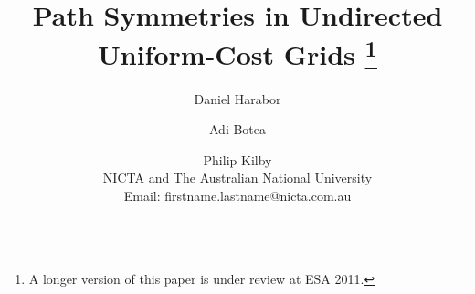 \documentclass{article}
\begin{document}
\title{Path Symmetries in Undirected Uniform-Cost Grids
\thanks{A longer version of this paper is under review at ESA 2011. }
}
\author{Daniel Harabor \and Adi Botea \and Philip Kilby \\
NICTA and The Australian National University \\
Email: firstname.lastname@nicta.com.au}

\maketitle












%



\end{document}
